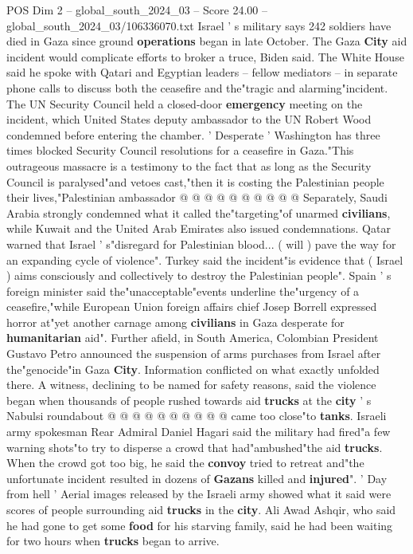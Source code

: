 \begin{textsample}{POS Dim 2 – global\_south\_2024\_03 – Score 24.00 – global\_south\_2024\_03/106336070.txt}
Israel ' s military says 242 soldiers have died in Gaza since ground \textbf{operations} began in late October.
The Gaza \textbf{City} aid incident would complicate efforts to broker a truce, Biden said.
The White House said he spoke with Qatari and Egyptian leaders -- fellow mediators -- in separate phone calls to discuss both the ceasefire and the"tragic and alarming"incident.
The UN Security Council held a closed-door \textbf{emergency} meeting on the incident, which United States deputy ambassador to the UN Robert Wood condemned before entering the chamber. ' Desperate ' Washington has three times blocked Security Council resolutions for a ceasefire in Gaza."This outrageous massacre is a testimony to the fact that as long as the Security Council is paralysed"and vetoes cast,"then it is costing the Palestinian people their lives,"Palestinian ambassador @ @ @ @ @ @ @ @ @ @ Separately, Saudi Arabia strongly condemned what it called the"targeting"of unarmed \textbf{civilians}, while Kuwait and the United Arab Emirates also issued condemnations.
Qatar warned that Israel ' s"disregard for Palestinian blood... ( will ) pave the way for an expanding cycle of violence".
Turkey said the incident"is evidence that ( Israel ) aims consciously and collectively to destroy the Palestinian people".
Spain ' s foreign minister said the"unacceptable"events underline the"urgency of a ceasefire,"while European Union foreign affairs chief Josep Borrell expressed horror at"yet another carnage among \textbf{civilians} in Gaza desperate for \textbf{humanitarian} aid".
Further afield, in South America, Colombian President Gustavo Petro announced the suspension of arms purchases from Israel after the"genocide"in Gaza \textbf{City}.
Information conflicted on what exactly unfolded there.
A witness, declining to be named for safety reasons, said the violence began when thousands of people rushed towards aid \textbf{trucks} at the \textbf{city} ' s Nabulsi roundabout @ @ @ @ @ @ @ @ @ @ came too close"to \textbf{tanks}.
Israeli army spokesman Rear Admiral Daniel Hagari said the military had fired"a few warning shots"to try to disperse a crowd that had"ambushed"the aid \textbf{trucks}.
When the crowd got too big, he said the \textbf{convoy} tried to retreat and"the unfortunate incident resulted in dozens of \textbf{Gazans} killed and \textbf{injured}". ' Day from hell ' Aerial images released by the Israeli army showed what it said were scores of people surrounding aid \textbf{trucks} in the \textbf{city}.
Ali Awad Ashqir, who said he had gone to get some \textbf{food} for his starving family, said he had been waiting for two hours when \textbf{trucks} began to arrive.

\end{textsample}
